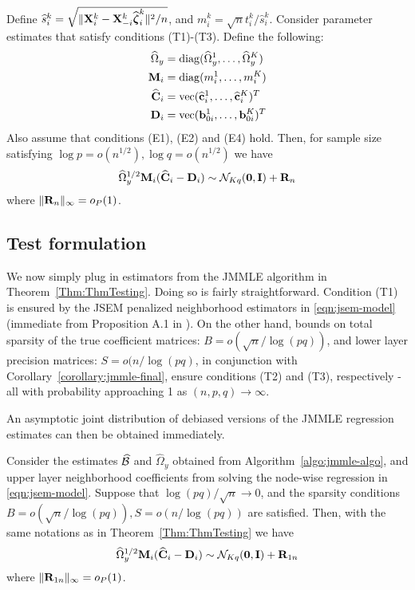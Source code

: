 \begin{Theorem}\label{Thm:ThmTesting}
Define $\widehat s_i^k = \sqrt{\| {\mathbf{X}}_i^k - {\mathbf{X}}_{-i}^k \widehat {{\boldsymbol{\zeta}}}_i^k \|^2/n}$, and $m_i^k = \sqrt n t_i^k / \widehat s_i^k$. Consider parameter estimates that satisfy conditions (T1)-(T3). Define the following:
%
\begin{align*}
\widehat \Omega_y &= \operatorname*{diag}(\widehat \Omega_y^1, \ldots, \widehat \Omega_y^K)\\
{\mathbf{M}}_i &= \operatorname*{diag}(m_i^1, \ldots, m_i^K)\\
\widehat {{\mathbf{C}}}_i &= \operatorname*{vec}(\widehat {{\bf{c}}}_i^1, \ldots, \widehat {{\bf{c}}}_i^K)^T\\
{\mathbf{D}}_i &= \operatorname*{vec}({\bf{b}}_{0i}^1, \ldots, {\bf{b}}_{0i}^K)^T\\
\end{align*}
%
Also assume that conditions (E1), (E2) and (E4) hold. Then, for sample size satisfying 
$\log p = o(n^{1/2}), \log q = o(n^{1/2})$ we have
%
\begin{align}\label{eqn:ThmTestingEqn}
\widehat \Omega_y^{1/2} {\mathbf{M}}_i (\widehat {{\mathbf{C}}}_i - {\mathbf{D}}_i) \sim
{\cal{N}}_{Kq} ({\bf 0}, {\mathbf{I}}) + {\mathbf{R}}_n
\end{align}
%
where $\| {\mathbf{R}}_n \|_\infty = o_P(1)$.
\end{Theorem}
%

\subsection{Test formulation}
\label{sec:testing-subsec-2}
We now simply plug in estimators from the JMMLE algorithm in Theorem~\ref{Thm:ThmTesting}. Doing so is fairly straightforward. Condition (T1) is ensured by the JSEM penalized neighborhood estimators in \eqref{eqn:jsem-model} (immediate from Proposition A.1 in \cite{MaMichailidis15}). On the other hand, bounds on total sparsity of the true coefficient matrices: $B = o(\sqrt{n} / \log(pq))$, and lower layer precision matrices: $S = o( n/ \log (pq)$, in conjunction with Corollary~\ref{corollary:jmmle-final}, ensure conditions (T2) and (T3), respectively -all with probability approaching 1 as $(n,p,q) \rightarrow \infty$.

An asymptotic joint distribution of debiased versions of the JMMLE regression estimates can then be obtained immediately.
%
\begin{Corollary}\label{corollary:CorTesting}
Consider the estimates $\widehat {{\cal{B}}}$ and $\widehat \Omega_y $ obtained from Algorithm~\ref{algo:jmmle-algo}, and upper layer neighborhood coefficients from solving the node-wise regression in \eqref{eqn:jsem-model}. Suppose that $\log (pq) /\sqrt n \rightarrow 0$, and the sparsity conditions $B = o(\sqrt{n} / \log(pq)), S = o( n / \log(pq))$ are satisfied. Then, with the same notations as in Theorem~\ref{Thm:ThmTesting} we have
%
\begin{align}\label{eqn:CorTestingEqn}
\widehat \Omega_y^{1/2} {\mathbf{M}}_i (\widehat {{\mathbf{C}}}_i - {\mathbf{D}}_i) \sim
{\cal{N}}_{Kq} ({\bf 0}, {\mathbf{I}}) + {\mathbf{R}}_{1n}
\end{align}
%
where $\| {\mathbf{R}}_{1n} \|_\infty = o_P(1)$.
\end{Corollary}

